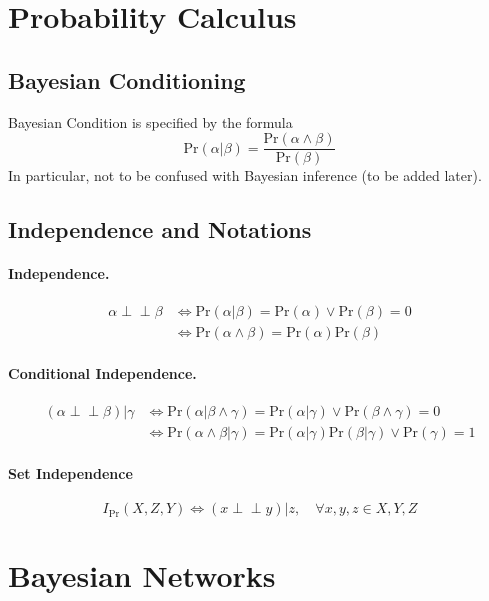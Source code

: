 \documentclass[11pt]{article}
\newcommand{\independent}{\perp \!\!\! \perp}
\newcommand{\pr}{\mathrm{Pr}}
\begin{document}
\section{Probability Calculus}
\subsection{Bayesian Conditioning}
Bayesian Condition is specified by the formula 
\begin{equation}
	\pr ( \alpha | \beta) = \frac{\pr ( \alpha \land \beta )}{\pr ( \beta) }
\end{equation}
In particular, not to be confused with Bayesian inference (to be added later). 

\subsection{Independence and Notations}
\paragraph{Independence.}  
\begin{align}
	\alpha \independent \beta 
	& \iff \pr ( \alpha | \beta) = \pr ( \alpha) \vee \pr( \beta) = 0 \\
	& \iff \pr ( \alpha \land \beta) = \pr(\alpha) \pr ( \beta)
\end{align}

\paragraph{Conditional Independence.}
\begin{align}
	(\alpha \independent \beta) | \gamma 
	&\iff \pr ( \alpha | \beta \land \gamma) = \pr ( \alpha | \gamma) \vee \pr(\beta \land \gamma) = 0 \\
	&\iff \pr ( \alpha \land \beta | \gamma) = \pr ( \alpha | \gamma ) \pr(\beta | \gamma ) \vee \pr ( \gamma) = 1
\end{align}

\paragraph{Set Independence}
\begin{equation}
	I_{\pr} (X, Z, Y) \iff (x \independent y) | z, \quad \forall x, y, z \in X, Y, Z
\end{equation}

\section{Bayesian Networks}
\end{document}
